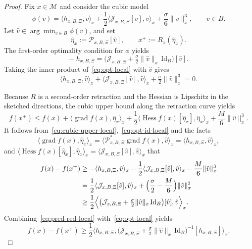 \documentclass[final,onefignum,onetabnum]{siamart250211}
\DeclareMathOperator{\grad}{grad}
\newcommand{\Hess}{\operatorname{Hess}}
\begin{document}
\begin{proof}
Fix $x\in \mathcal M$ and consider the cubic model
\[
\phi(v)
=
\langle h_{x,B,\Xi},v\rangle_x
+\frac{1}{2}\langle \mathcal J_{x,B,\Xi}[v],v\rangle_x
+\frac{\sigma}{6}\|v\|_x^3,
\qquad
v\in B.
\]
Let $\hat v\in \arg\min_{v\in B}\phi(v)$, and set
\[
\hat\eta_x:=\mathcal P_{x,B,\Xi}[\hat v],
\qquad
x^+:=R_x(\hat\eta_x).
\]
The first-order optimality condition for $\phi$ yields
\begin{equation}
-\;h_{x,B,\Xi}
=
\bigl(\mathcal J_{x,B,\Xi}+\tfrac{\sigma}{2}\|\hat v\|_x\,\mathrm{Id}_B\bigr)[\hat v].
\label{eq:opt-local}
\end{equation}
Taking the inner product of~\eqref{eq:opt-local} with $\hat v$ gives
\begin{equation}
\langle h_{x,B,\Xi},\hat v\rangle_x
+
\langle \mathcal J_{x,B,\Xi}[\hat v],\hat v\rangle_x
+
\tfrac{\sigma}{2}\|\hat v\|_x^3
=
0.
\label{eq:opt-id-local}
\end{equation}

Because $R$ is a second-order retraction and the Hessian is Lipschitz in the sketched directions, the cubic upper bound along the retraction curve yields
\begin{equation}
f(x^+)
\le
f(x)
+
\langle \grad f(x),\hat\eta_x\rangle_x
+
\frac{1}{2}\langle \Hess f(x)[\hat\eta_x],\hat\eta_x\rangle_x
+
\frac{M}{6}\|\hat v\|_x^3.
\label{eq:cubic-upper-local}
\end{equation}
It follows from~\eqref{eq:cubic-upper-local},~\eqref{eq:opt-id-local} and the facts
\[
\langle \grad f(x),\hat\eta_x\rangle_x
=
\langle \mathcal P_{x,B,\Xi}^*\grad f(x),\hat v\rangle_x
=
\langle h_{x,B,\Xi},\hat v\rangle_x,
\]
and
$
\langle \Hess f(x)[\hat\eta_x],\hat\eta_x\rangle_x
=
\langle \mathcal J_{x,B,\Xi}[\hat v],\hat v\rangle_x
$
that
\begin{align}
f(x)-f(x^+)
&\ge
-\langle h_{x,B,\Xi},\hat v\rangle_x
-\frac{1}{2}\langle \mathcal J_{x,B,\Xi}[\hat v],\hat v\rangle_x
-\frac{M}{6}\|\hat v\|_x^3 \nonumber\\
&=
\frac{1}{2}\langle \mathcal J_{x,B,\Xi}[\hat v],\hat v\rangle_x
+
\Bigl(\frac{\sigma}{2}-\frac{M}{6}\Bigr)\|\hat v\|_x^3 \nonumber\\
&\ge
\frac{1}{2}
\Big\langle
\bigl(\mathcal J_{x,B,\Xi}+\tfrac{\sigma}{2}\|\hat v\|_x\,\mathrm{Id}_B\bigr)[\hat v],\hat v
\Big\rangle_x.
\label{eq:pred-red-local}
\end{align}
Combining~\eqref{eq:pred-red-local} with~\eqref{eq:opt-local} yields
\begin{equation}
f(x)-f(x^+)
\ge
\frac{1}{2}
\Big\langle
h_{x,B,\Xi},
\bigl(\mathcal J_{x,B,\Xi}+\tfrac{\sigma}{2}\|\hat v\|_x\,\mathrm{Id}_B\bigr)^{-1}[h_{x,B,\Xi}]
\Big\rangle_x.
\label{eq:key-local}
\end{equation}


\end{proof}
\end{document}
